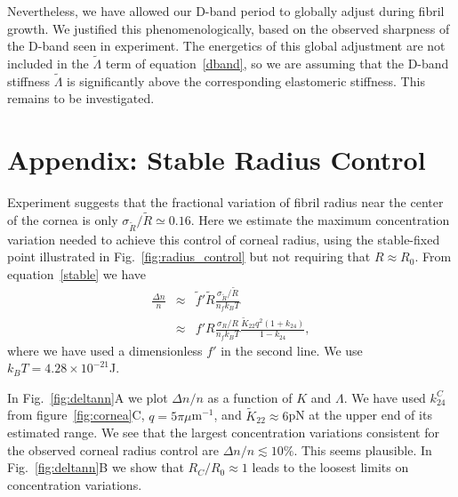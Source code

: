\documentclass[twoside,twocolumn,9pt]{article}
\begin{document}
Nevertheless, we have allowed our D-band period to globally adjust during fibril growth. We justified this phenomenologically, based on the observed sharpness of the D-band seen in experiment.\cite{Baldwin:2020, Berenguer:2014, Hodge:1989, Quan:2015} The energetics of this global adjustment are not included in the $\tilde{\Lambda}$ term of equation~\ref{dband}, so we are assuming that the D-band stiffness $\tilde{\Lambda}$ is significantly above the corresponding elastomeric stiffness. This remains to be investigated.

\section{Appendix: Stable Radius Control}
Experiment suggests that the fractional variation  of fibril radius near the center of the cornea is only $\sigma_{\tilde{R}}/\tilde{R} \simeq 0.16$.\cite{Cox:1970} Here we estimate the maximum concentration variation needed to achieve this control of corneal radius, using the stable-fixed point illustrated in Fig.~\ref{fig:radius_control} but not requiring that $R \approx R_0$.  From equation~\ref{stable} we have
\begin{eqnarray}
    \frac{\Delta n}{n} &\approx& \tilde{f}' \tilde{R}
             \frac{\sigma_{\tilde{R}}/ \tilde{R}}{n_f k_B T} \\
    & \approx& f' R
             \frac{\sigma_{R}/R}{n_f k_B T} \frac{\tilde{K}_{22} q^2 (1+k_{24})}{1-k_{24}},
             \label{dnn}
\end{eqnarray}
where we have used a dimensionless $f'$ in the second line.  We use $k_B T=4.28 \times 10^{-21}$J.

In Fig.~\ref{fig:deltann}A we plot $\Delta n/n$ as a function of $K$ and $\Lambda$. We have  used $k_{24}^C$ from figure~\ref{fig:cornea}C, $q=5\pi \mu$m$^{-1}$, and $\tilde{K}_{22} \approx 6$pN at the upper end of its estimated range.\cite{Cameron:2018} We see that the largest concentration variations  consistent for the observed corneal radius control are $\Delta n/n \lesssim 10\%$. This seems plausible. In  Fig.~\ref{fig:deltann}B we show that $R_C/R_0 \approx 1$ leads to the loosest limits on concentration variations. 
\end{document}
